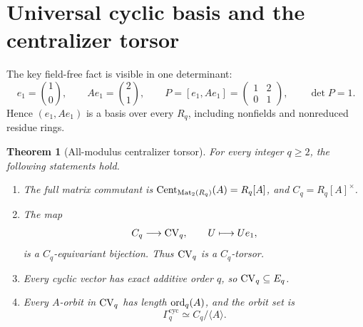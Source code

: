 \documentclass[11pt]{article}
\newtheorem{theorem}{Theorem}[section]
\theoremstyle{definition}
\theoremstyle{remark}
\begin{document}
\section{Universal cyclic basis and the centralizer torsor}
\label{sec:torsor}

The key field-free fact is visible in one determinant:
\begin{equation}
  e_1=\binom10,
  \qquad
  Ae_1=\binom21,
  \qquad
  P=[e_1,Ae_1]=\begin{pmatrix}1&2\\0&1\end{pmatrix},
  \qquad \det P=1.
  \label{eq:universal-cyclic-basis}
\end{equation}
Hence \((e_1,Ae_1)\) is a basis over every \(R_q\), including nonfields and
nonreduced residue rings.

\begin{theorem}[All-modulus centralizer torsor]
\label{thm:torsor}
For every integer \(q\ge2\), the following statements hold.
\begin{enumerate}
  \item The full matrix commutant is
        \(\operatorname{Cent}_{\operatorname{Mat}_2(R_q)}(A)=R_q[A]\), and
        \(C_q=R_q[A]^\times\).
  \item The map
        \begin{equation}
          C_q\longrightarrow\mathrm{CV}_q,
          \qquad U\longmapsto Ue_1,
          \label{eq:torsor-map}
        \end{equation}
        is a \(C_q\)-equivariant bijection.  Thus \(\mathrm{CV}_q\) is a
        \(C_q\)-torsor.
  \item Every cyclic vector has exact additive order \(q\), so
        \(\mathrm{CV}_q\subseteq E_q\).
  \item Every \(A\)-orbit in \(\mathrm{CV}_q\) has length \(\operatorname{ord}_q(A)\), and the
        orbit set is
        \begin{equation}
          \Gamma_q^{\mathrm{cyc}}
          \simeq C_q/\langle A\rangle.
          \label{eq:A-orbit-cosets}
        \end{equation}
\end{enumerate}
\end{theorem}
\end{document}
